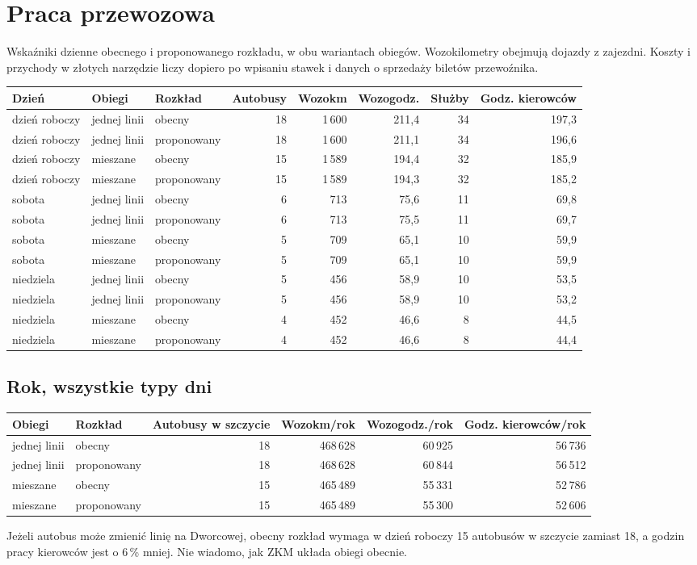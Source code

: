 \documentclass[10pt,a4paper]{article}
\begin{document}
\section{Praca przewozowa}
Wskaźniki dzienne obecnego i proponowanego rozkładu, w obu wariantach obiegów. Wozokilometry obejmują dojazdy z zajezdni. Koszty i przychody w złotych narzędzie liczy dopiero po wpisaniu stawek i danych o sprzedaży biletów przewoźnika.
{\footnotesize
\begin{longtable}{@{}l l l r r r r r@{}}\toprule
Dzień & Obiegi & Rozkład & Autobusy & Wozokm & Wozogodz. & Służby & Godz. kierowców \\ \midrule\endhead
\bottomrule\endfoot
dzień roboczy & jednej linii & obecny & 18 & 1\,600 & 211,4 & 34 & 197,3 \\
dzień roboczy & jednej linii & proponowany & 18 & 1\,600 & 211,1 & 34 & 196,6 \\
dzień roboczy & mieszane & obecny & 15 & 1\,589 & 194,4 & 32 & 185,9 \\
dzień roboczy & mieszane & proponowany & 15 & 1\,589 & 194,3 & 32 & 185,2 \\
sobota & jednej linii & obecny & 6 & 713 & 75,6 & 11 & 69,8 \\
sobota & jednej linii & proponowany & 6 & 713 & 75,5 & 11 & 69,7 \\
sobota & mieszane & obecny & 5 & 709 & 65,1 & 10 & 59,9 \\
sobota & mieszane & proponowany & 5 & 709 & 65,1 & 10 & 59,9 \\
niedziela & jednej linii & obecny & 5 & 456 & 58,9 & 10 & 53,5 \\
niedziela & jednej linii & proponowany & 5 & 456 & 58,9 & 10 & 53,2 \\
niedziela & mieszane & obecny & 4 & 452 & 46,6 & 8 & 44,5 \\
niedziela & mieszane & proponowany & 4 & 452 & 46,6 & 8 & 44,4 \\
\end{longtable}}
\subsection*{Rok, wszystkie typy dni}
{\small
\begin{center}\begin{tabular}{@{}l l r r r r@{}}\toprule
Obiegi & Rozkład & Autobusy w szczycie & Wozokm/rok & Wozogodz./rok & Godz. kierowców/rok \\ \midrule
jednej linii & obecny & 18 & 468\,628 & 60\,925 & 56\,736 \\
jednej linii & proponowany & 18 & 468\,628 & 60\,844 & 56\,512 \\
mieszane & obecny & 15 & 465\,489 & 55\,331 & 52\,786 \\
mieszane & proponowany & 15 & 465\,489 & 55\,300 & 52\,606 \\
\bottomrule\end{tabular}\end{center}}
Jeżeli autobus może zmienić linię na Dworcowej, obecny rozkład wymaga w dzień roboczy 15 autobusów w szczycie zamiast 18, a godzin pracy kierowców jest o 6\,\% mniej. Nie wiadomo, jak ZKM układa obiegi obecnie.
\end{document}
